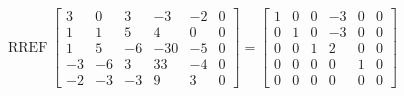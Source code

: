 \begin{exerciseAnswer} 


\[\operatorname{RREF} \left[\begin{array}{ccccc|c}
3 & 0 & 3 & -3 & -2 & 0 \\
1 & 1 & 5 & 4 & 0 & 0 \\
1 & 5 & -6 & -30 & -5 & 0 \\
-3 & -6 & 3 & 33 & -4 & 0 \\
-2 & -3 & -3 & 9 & 3 & 0
\end{array}\right] = \left[\begin{array}{ccccc|c}
1 & 0 & 0 & -3 & 0 & 0 \\
0 & 1 & 0 & -3 & 0 & 0 \\
0 & 0 & 1 & 2 & 0 & 0 \\
0 & 0 & 0 & 0 & 1 & 0 \\
0 & 0 & 0 & 0 & 0 & 0
\end{array}\right] \]



\end{exerciseAnswer}

